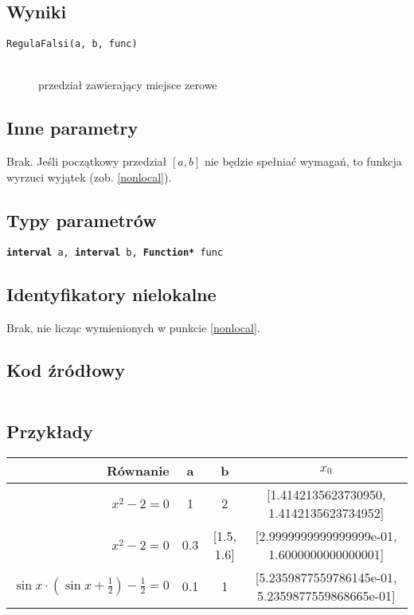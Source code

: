 \documentclass[12pt]{article}
\begin{document}
		\subsection{Wyniki}
			\begin{description}
				\item[\texttt{RegulaFalsi(a, b, func)}] \hfill\\
					przedział zawierający miejsce zerowe
			\end{description}

		\subsection{Inne parametry}
			Brak. Jeśli początkowy przedział $[a, b]$ nie będzie spełniać wymagań, to funkcja wyrzuci wyjątek (zob. \ref{nonlocal}).

		\subsection{Typy parametrów}
			\texttt{\textbf{interval} a, \textbf{interval} b, \textbf{Function*} func}

		\subsection{Identyfikatory nielokalne}
      Brak, nie licząc wymienionych w punkcie \ref{nonlocal}.

		\subsection{Kod źródłowy}
			\inputminted[firstline=3, lastline=36]{c++}{../solvers/regulafalsi.cpp}

		\subsection{Przykłady}
			\begin{tabular}{|r|c|c||c|}
				\hline
				Równanie & a & b & $x_0$ \\\hline

				$x^2 - 2 = 0$ & 1 & 2 & [1.4142135623730950, 1.4142135623734952]\\\hline
				$x^2 - 2 = 0$ & 0.3 & [1.5, 1.6] & [2.9999999999999999e-01, 1.6000000000000001]\\\hline
				$\sin{x} \cdot (\sin{x} + \frac{1}{2}) - \frac{1}{2} = 0$ & 0.1 & 1 & [5.2359877559786145e-01, 5.2359877559868665e-01] \\\hline

			\end{tabular}
\end{document}
